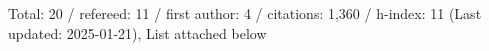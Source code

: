 Total: 20 / refereed: 11 / first author: 4 / citations: 1,360 / h-index: 11 (Last updated: 2025-01-21), List attached below